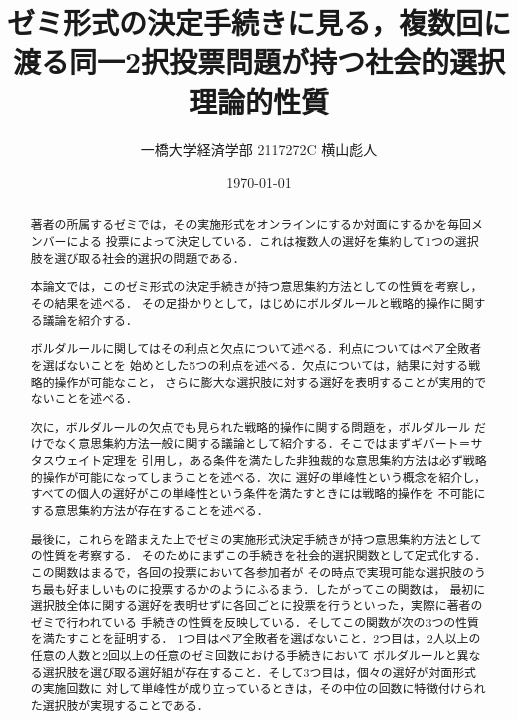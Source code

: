 \documentclass[dvipdfmx]{jsarticle}
\begin{document}
\title{ゼミ形式の決定手続きに見る，複数回に渡る同一2択投票問題が持つ社会的選択理論的性質}
\author{一橋大学経済学部 2117272C 横山彪人}
\date{\today}
\maketitle

\begin{abstract}
  著者の所属するゼミでは，その実施形式をオンラインにするか対面にするかを毎回メンバーによる
  投票によって決定している．これは複数人の選好を集約して1つの選択肢を選び取る社会的選択の問題である．
  
  本論文では，このゼミ形式の決定手続きが持つ意思集約方法としての性質を考察し，その結果を述べる．
  その足掛かりとして，はじめにボルダルールと戦略的操作に関する議論を紹介する．
  
  ボルダルールに関してはその利点と欠点について述べる．利点についてはペア全敗者を選ばないことを
  始めとした5つの利点を述べる．欠点については，結果に対する戦略的操作が可能なこと，
  さらに膨大な選択肢に対する選好を表明することが実用的でないことを述べる．
  
  次に，ボルダルールの欠点でも見られた戦略的操作に関する問題を，ボルダルール
  だけでなく意思集約方法一般に関する議論として紹介する．そこではまずギバート＝サタスウェイト定理を
  引用し，ある条件を満たした非独裁的な意思集約方法は必ず戦略的操作が可能になってしまうことを述べる．次に
  選好の単峰性という概念を紹介し，すべての個人の選好がこの単峰性という条件を満たすときには戦略的操作を
  不可能にする意思集約方法が存在することを述べる．
  
  最後に，これらを踏まえた上でゼミの実施形式決定手続きが持つ意思集約方法としての性質を考察する．
  そのためにまずこの手続きを社会的選択関数として定式化する．この関数はまるで，各回の投票において各参加者が
  その時点で実現可能な選択肢のうち最も好ましいものに投票するかのようにふるまう．したがってこの関数は，
  最初に選択肢全体に関する選好を表明せずに各回ごとに投票を行うといった，実際に著者のゼミで行われている
  手続きの性質を反映している．そしてこの関数が次の3つの性質を満たすことを証明する．
  1つ目はペア全敗者を選ばないこと．2つ目は，2人以上の任意の人数と2回以上の任意のゼミ回数における手続きにおいて
  ボルダルールと異なる選択肢を選び取る選好組が存在すること．そして3つ目は，個々の選好が対面形式の実施回数に
  対して単峰性が成り立っているときは，その中位の回数に特徴付けられた選択肢が実現することである．
\end{abstract}

\tableofcontents
\clearpage
\end{document}
